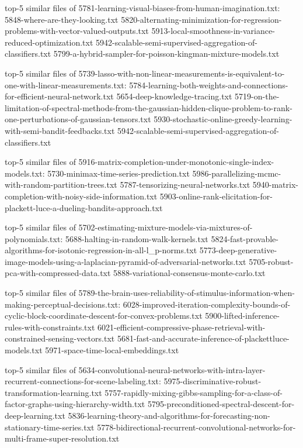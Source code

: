 \documentclass[11pt]{article}
\begin{document}
top-5 similar files of
5781-learning-visual-biases-from-human-imagination.txt:
5848-where-are-they-looking.txt
5820-alternating-minimization-for-regression-problems-with-vector-valued-outputs.txt
5913-local-smoothness-in-variance-reduced-optimization.txt
5942-scalable-semi-supervised-aggregation-of-classifiers.txt
5799-a-hybrid-sampler-for-poisson-kingman-mixture-models.txt

top-5 similar files of
5739-lasso-with-non-linear-measurements-is-equivalent-to-one-with-linear-measurements.txt:
5784-learning-both-weights-and-connections-for-efficient-neural-network.txt
5654-deep-knowledge-tracing.txt
5719-on-the-limitation-of-spectral-methods-from-the-gaussian-hidden-clique-problem-to-rank-one-perturbations-of-gaussian-tensors.txt
5930-stochastic-online-greedy-learning-with-semi-bandit-feedbacks.txt
5942-scalable-semi-supervised-aggregation-of-classifiers.txt

top-5 similar files of
5916-matrix-completion-under-monotonic-single-index-models.txt:
5730-minimax-time-series-prediction.txt
5986-parallelizing-mcmc-with-random-partition-trees.txt
5787-tensorizing-neural-networks.txt
5940-matrix-completion-with-noisy-side-information.txt
5903-online-rank-elicitation-for-plackett-luce-a-dueling-bandits-approach.txt

top-5 similar files of
5702-estimating-mixture-models-via-mixtures-of-polynomials.txt:
5688-halting-in-random-walk-kernels.txt
5824-fast-provable-algorithms-for-isotonic-regression-in-all-l\_p-norms.txt
5773-deep-generative-image-models-using-a-laplacian-pyramid-of-adversarial-networks.txt
5705-robust-pca-with-compressed-data.txt
5888-variational-consensus-monte-carlo.txt

top-5 similar files of
5789-the-brain-uses-reliability-of-stimulus-information-when-making-perceptual-decisions.txt:
6028-improved-iteration-complexity-bounds-of-cyclic-block-coordinate-descent-for-convex-problems.txt
5900-lifted-inference-rules-with-constraints.txt
6021-efficient-compressive-phase-retrieval-with-constrained-sensing-vectors.txt
5681-fast-and-accurate-inference-of-plackettluce-models.txt
5971-space-time-local-embeddings.txt

top-5 similar files of
5634-convolutional-neural-networks-with-intra-layer-recurrent-connections-for-scene-labeling.txt:
5975-discriminative-robust-transformation-learning.txt
5757-rapidly-mixing-gibbs-sampling-for-a-class-of-factor-graphs-using-hierarchy-width.txt
5795-preconditioned-spectral-descent-for-deep-learning.txt
5836-learning-theory-and-algorithms-for-forecasting-non-stationary-time-series.txt
5778-bidirectional-recurrent-convolutional-networks-for-multi-frame-super-resolution.txt
\end{document}
